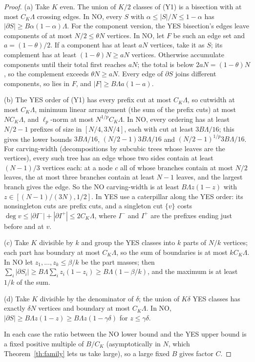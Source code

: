 \documentclass[11pt,letterpaper]{article}
\theoremstyle{definition}
\theoremstyle{remark}
\begin{document}
\begin{proof}
(a) Take \(K\) even. The union of \(K/2\) classes of (Y1) is a bisection
with at most \(C_K\Lambda\) crossing edges. In NO, every \(S\) with
\(\alpha\le|S|/N\le1-\alpha\) has \(|\partial S|\ge B\alpha(1-\alpha)\Lambda\).
For the component version, the YES bisection's edges leave components of at
most \(N/2\le\theta N\) vertices. In NO, let \(F\) be such an edge set and
\(a=(1-\theta)/2\). If a component has at least \(aN\) vertices, take it as
\(S\); its complement has at least \((1-\theta)N\ge aN\) vertices. Otherwise
accumulate components until their total first reaches \(aN\); the total is
below \(2aN=(1-\theta)N\), so the complement exceeds \(\theta N\ge aN\).
Every edge of \(\partial S\) joins different components, so lies in \(F\),
and \(|F|\ge B\Lambda a(1-a)\).

(b) The YES order of (Y1) has every prefix cut at most \(C_K\Lambda\), so
cutwidth at most \(C_K\Lambda\), minimum linear arrangement (the sum of the
prefix cuts) at most \(NC_K\Lambda\), and \(\ell_p\)-norm at most
\(N^{1/p}C_K\Lambda\). In NO, every ordering has at least \(N/2-1\) prefixes
of size in \([N/4,3N/4]\), each with cut at least \(3B\Lambda/16\); this
gives the lower bounds \(3B\Lambda/16\), \((N/2-1)3B\Lambda/16\) and
\((N/2-1)^{1/p}3B\Lambda/16\). For carving-width (decompositions by
subcubic trees whose leaves are the vertices), every such tree has an edge
whose two sides contain at least \((N-1)/3\) vertices each: at a node \(c\)
all of whose branches contain at most \(N/2\) leaves, the at most three
branches contain at least \(N-1\) leaves, and the largest branch gives the
edge. So the NO carving-width is at least \(B\Lambda z(1-z)\) with
\(z\in[(N-1)/(3N),1/2]\). In YES use a caterpillar along the YES order: its
nonsingleton cuts are prefix cuts, and a singleton cut \(\{v\}\) costs
\(\deg v\le|\partial I^-|+|\partial I^+|\le2C_K\Lambda\), where \(I^-\) and
\(I^+\) are the prefixes ending just before and at \(v\).

(c) Take \(K\) divisible by \(k\) and group the YES classes into \(k\) parts
of \(N/k\) vertices; each part has boundary at most \(C_K\Lambda\), so the
sum of boundaries is at most \(kC_K\Lambda\). In NO let \(z_1,\dots,z_k\le
\beta/k\) be the part masses; then
\(\sum_i|\partial S_i|\ge B\Lambda\sum_iz_i(1-z_i)\ge B\Lambda(1-\beta/k)\),
and the maximum is at least \(1/k\) of the sum.

(d) Take \(K\) divisible by the denominator of \(\delta\); the union of
\(K\delta\) YES classes has exactly \(\delta N\) vertices and boundary at
most \(C_K\Lambda\). In NO, \(|\partial S|\ge B\Lambda z(1-z)\ge
B\Lambda z(1-\gamma\delta)\) for \(z\le\gamma\delta\).

In each case the ratio between the NO lower bound and the YES upper bound
is a fixed positive multiple of \(B/C_K\) (asymptotically in \(N\), which
Theorem~\ref{th:family} lets us take large), so a large fixed \(B\) gives
factor \(C\).
\end{proof}
\end{document}
